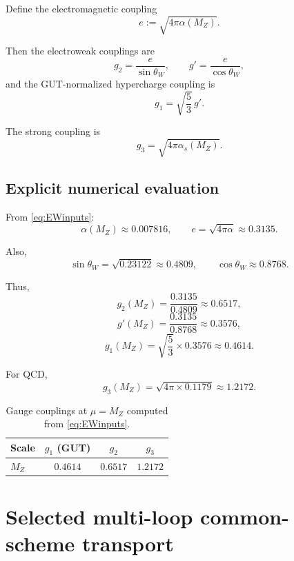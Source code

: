 \documentclass[11pt]{article}
\begin{document}
Define the electromagnetic coupling
\begin{equation}
e := \sqrt{4\pi \alpha(M_Z)}.
\end{equation}

Then the electroweak couplings are
\begin{equation}
g_2 = \frac{e}{\sin\theta_W},
\qquad
g' = \frac{e}{\cos\theta_W},
\end{equation}
and the GUT-normalized hypercharge coupling is
\begin{equation}
g_1 = \sqrt{\frac{5}{3}}\, g'.
\end{equation}

The strong coupling is
\begin{equation}
g_3 = \sqrt{4\pi \alpha_s(M_Z)}.
\end{equation}

\subsection{Explicit numerical evaluation}

From \eqref{eq:EWinputs}:
\[
\alpha(M_Z) \approx 0.007816,
\qquad
e = \sqrt{4\pi\alpha} \approx 0.3135.
\]

Also,
\[
\sin\theta_W = \sqrt{0.23122} \approx 0.4809,
\qquad
\cos\theta_W \approx 0.8768.
\]

Thus,
\[
g_2(M_Z) = \frac{0.3135}{0.4809} \approx 0.6517,
\]
\[
g'(M_Z) = \frac{0.3135}{0.8768} \approx 0.3576,
\]
\[
g_1(M_Z) = \sqrt{\frac{5}{3}}\times 0.3576 \approx 0.4614.
\]

For QCD,
\[
g_3(M_Z) = \sqrt{4\pi\times 0.1179} \approx 1.2172.
\]

\begin{table}[h]
\centering
\begin{tabular}{lccc}
\toprule
Scale & $g_1$ (GUT) & $g_2$ & $g_3$ \\
\midrule
$M_Z$ & $0.4614$ & $0.6517$ & $1.2172$ \\
\bottomrule
\end{tabular}
\caption{Gauge couplings at $\mu=M_Z$ computed from \eqref{eq:EWinputs}.}
\end{table}


\section{Selected multi-loop common-scheme transport}
\end{document}
